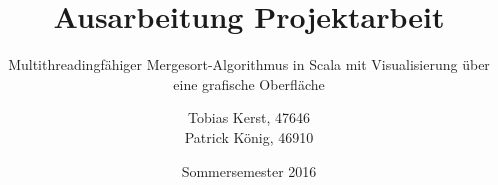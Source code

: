 \documentclass[a4paper,titlepage,12pt]{scrreprt}
\begin{document}
\titlehead{
	\texttt{[image: hska\_logo]}
}

\title{Ausarbeitung Projektarbeit}
\subtitle{Multithreadingfähiger Mergesort-Algorithmus in Scala mit Visualisierung über eine grafische Oberfläche}
\author{%
	Tobias Kerst, 47646\\
	Patrick König, 46910
}
\date{Sommersemester 2016}
\publishers{
    \textbf{Dozent:} Prof. Dr. Heiko Körner
}
\maketitle

\clearpage

\begingroup
\hypersetup{linkcolor=black}
\tableofcontents
\endgroup

\clearpage


\clearpage


\clearpage


\clearpage


\clearpage


\clearpage


\clearpage


\clearpage



\clearpage

\listoffigures
\end{document}
